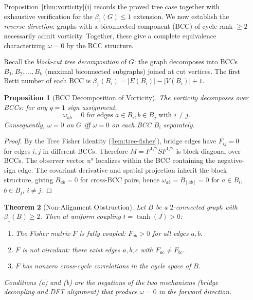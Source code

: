 \documentclass[11pt]{article}
\newtheorem{theorem}{Theorem}[section]
\newtheorem{proposition}[theorem]{Proposition}
\theoremstyle{definition}
\theoremstyle{remark}
\newcommand{\Fish}{F}
\newcommand{\Met}{M}
\newcommand{\obs}{u}
\newcommand{\vort}{\omega}
\newcommand{\betti}{\beta_1}
\begin{document}
Proposition~\ref{thm:vorticity}(i) records the proved tree case together
with exhaustive verification for the $\betti(G) \leq 1$
extension. We now establish
the \emph{reverse direction}: graphs with a biconnected component (BCC)
of cycle rank $\geq 2$ necessarily admit vorticity. Together, these give
a complete equivalence characterizing $\vort = 0$ by the BCC structure.

Recall the \emph{block-cut tree decomposition} of $G$: the graph decomposes
into BCCs $B_1, B_2, \ldots, B_k$ (maximal biconnected subgraphs) joined
at cut vertices. The first Betti number of each BCC is $\betti(B_i) = |E(B_i)|
- |V(B_i)| + 1$.

\begin{proposition}[BCC Decomposition of Vorticity]
\label{prop:bcc-decomposition}
The vorticity decomposes over BCCs: for any $q = 1$ sign assignment,
\[
  \vort_{ab} = 0 \text{ for edges } a \in B_i, b \in B_j \text{ with } i \neq j.
\]
Consequently, $\vort = 0$ on $G$ iff $\vort = 0$ on each BCC $B_i$ separately.
\end{proposition}

\begin{proof}
By the Tree Fisher Identity (\cref{lem:tree-fisher}), bridge edges have
$\Fish_{ij} = 0$ for edges $i, j$ in different BCCs. Therefore
$\Met = \Fish^{1/2} S \Fish^{1/2}$ is block-diagonal over BCCs. The observer
vector $\obs^a$ localizes within the BCC containing the negative-sign edge.
The covariant derivative and spatial projection inherit the block structure,
giving $B_{ab} = 0$ for cross-BCC pairs, hence $\vort_{ab} = B_{[ab]} = 0$
for $a \in B_i$, $b \in B_j$, $i \neq j$.
\end{proof}

\begin{theorem}[Non-Alignment Obstruction]
\label{thm:non-alignment}
Let $B$ be a $2$-connected graph with $\betti(B) \geq 2$. Then at uniform
coupling $t = \tanh(J) > 0$:
\begin{enumerate}
\item[(a)] The Fisher matrix $\Fish$ is \emph{fully coupled}: $\Fish_{ab} > 0$ for all edges $a, b$.
\item[(b)] $\Fish$ is not circulant: there exist edges $a, b, c$ with $\Fish_{ac} \neq \Fish_{bc}$.
\item[(c)] $\Fish$ has nonzero cross-cycle correlations in the cycle space of $B$.
\end{enumerate}
Conditions (a) and (b) are the negations of the two mechanisms (bridge decoupling and
DFT alignment) that produce $\vort = 0$ in the forward direction.
\end{theorem}
\end{document}
